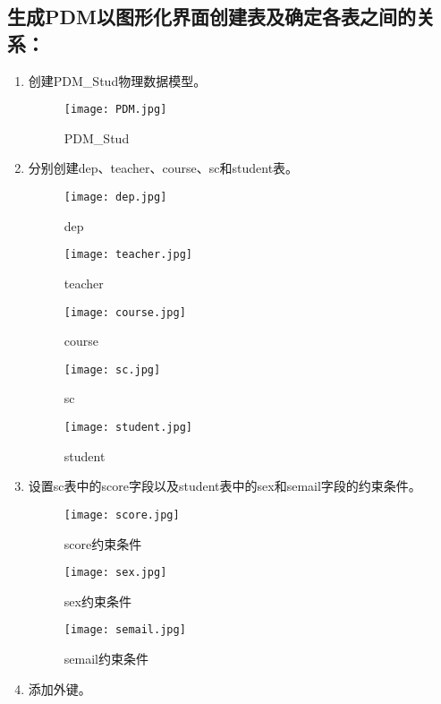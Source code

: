 \documentclass[a4paper]{uestcreport}
\begin{document}
\subsection{生成PDM以图形化界面创建表及确定各表之间的关系：}
\begin{enumerate}
    \item 创建PDM\_Stud物理数据模型。
          \begin{figure}[!htbp]
              \centering
              \texttt{[image: PDM.jpg]}
              \caption{PDM\_Stud}
          \end{figure}
          \newpage
    \item 分别创建dep、teacher、course、sc和student表。
          \begin{figure}[!htbp]
              \centering
              \texttt{[image: dep.jpg]}
              \caption{dep}
          \end{figure}
          \begin{figure}[!htbp]
              \centering
              \texttt{[image: teacher.jpg]}
              \caption{teacher}
          \end{figure}
          \begin{figure}[!htbp]
              \centering
              \texttt{[image: course.jpg]}
              \caption{course}
          \end{figure}
          \begin{figure}[!htbp]
              \centering
              \texttt{[image: sc.jpg]}
              \caption{sc}
          \end{figure}
          \begin{figure}[!htbp]
              \centering
              \texttt{[image: student.jpg]}
              \caption{student}
          \end{figure}
          \newpage
    \item 设置sc表中的score字段以及student表中的sex和semail字段的约束条件。
          \begin{figure}[!htbp]
              \centering
              \texttt{[image: score.jpg]}
              \caption{score约束条件}
          \end{figure}
          \begin{figure}[!htbp]
              \centering
              \texttt{[image: sex.jpg]}
              \caption{sex约束条件}
          \end{figure}
          \begin{figure}[!htbp]
              \centering
              \texttt{[image: semail.jpg]}
              \caption{semail约束条件}
          \end{figure}
          \newpage
    \item 添加外键。
\end{enumerate}
\end{document}

